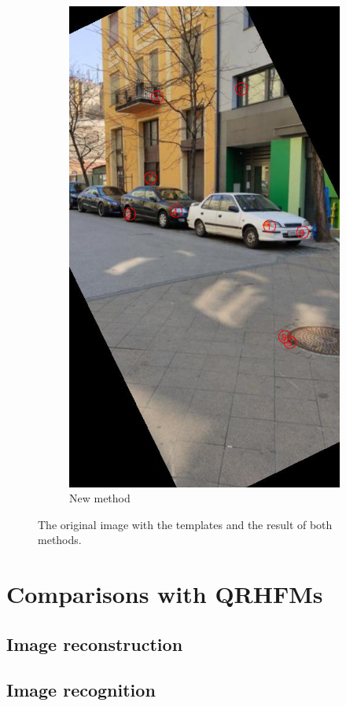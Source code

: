 \begin{figure}[tbp]
\begin{subfigure}{0.45\textwidth}
    \includegraphics[width=\textwidth, trim=0 200 0 80, clip]{figures/templates/new.png}
	\caption{New method}
    \end{subfigure}
    \caption{The original image with the templates and the result of both methods.}
    \label{fig:template_match}
\end{figure}


\section{Comparisons with QRHFMs}
\subsection{Image reconstruction}

\subsection{Image recognition}